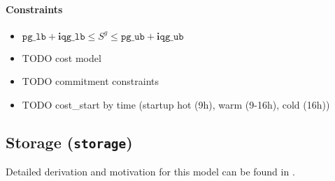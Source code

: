 \documentclass{article}
\begin{document}
\paragraph{Constraints}
\begin{itemize}
    \item $\texttt{pg\_lb} + \bm i \texttt{qg\_lb} \leq S^g \leq  \texttt{pg\_ub} + \bm i \texttt{qg\_ub}$
    \item TODO cost model
    \item TODO commitment constraints
    \item TODO cost\_start by time (startup hot (9h), warm (9-16h), cold (16h))
\end{itemize}


\subsection{Storage (\texttt{storage})}

Detailed derivation and motivation for this model can be found in \cite{}.
\end{document}
